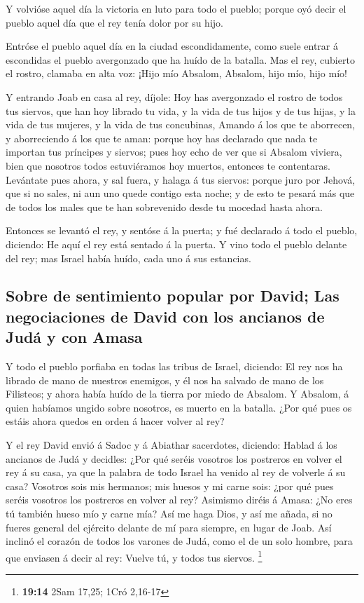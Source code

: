  Y volvióse aquel día la victoria en luto para todo el
pueblo; porque oyó decir el pueblo aquel día que el rey tenía dolor por
su hijo.

 Entróse el pueblo aquel día en la ciudad escondidamente,
como suele entrar á escondidas el pueblo avergonzado que ha huído de la
batalla.  Mas el rey, cubierto el rostro, clamaba en alta
voz: ¡Hijo mío Absalom, Absalom, hijo mío, hijo mío!

 Y entrando Joab en casa al rey, díjole: Hoy has avergonzado
el rostro de todos tus siervos, que han hoy librado tu vida, y la vida
de tus hijos y de tus hijas, y la vida de tus mujeres, y la vida de tus
concubinas,  Amando á los que te aborrecen, y aborreciendo á
los que te aman: porque hoy has declarado que nada te importan tus
príncipes y siervos; pues hoy echo de ver que si Absalom viviera, bien
que nosotros todos estuviéramos hoy muertos, entonces te contentaras.
 Levántate pues ahora, y sal fuera, y halaga á tus siervos:
porque juro por Jehová, que si no sales, ni aun uno quede contigo esta
noche; y de esto te pesará más que de todos los males que te han
sobrevenido desde tu mocedad hasta ahora.

 Entonces se levantó el rey, y sentóse á la puerta; y fué
declarado á todo el pueblo, diciendo: He aquí el rey está sentado á la
puerta. Y vino todo el pueblo delante del rey; mas Israel había huído,
cada uno á sus estancias.

\hypertarget{sobre-de-sentimiento-popular-por-david-las-negociaciones-de-david-con-los-ancianos-de-juduxe1-y-con-amasa}{%
\subsection{Sobre de sentimiento popular por David; Las negociaciones de
David con los ancianos de Judá y con
Amasa}\label{sobre-de-sentimiento-popular-por-david-las-negociaciones-de-david-con-los-ancianos-de-juduxe1-y-con-amasa}}

 Y todo el pueblo porfiaba en todas las tribus de Israel,
diciendo: El rey nos ha librado de mano de nuestros enemigos, y él nos
ha salvado de mano de los Filisteos; y ahora había huído de la tierra
por miedo de Absalom.  Y Absalom, á quien habíamos ungido
sobre nosotros, es muerto en la batalla. ¿Por qué pues os estáis ahora
quedos en orden á hacer volver al rey?

 Y el rey David envió á Sadoc y á Abiathar sacerdotes,
diciendo: Hablad á los ancianos de Judá y decidles: ¿Por qué seréis
vosotros los postreros en volver el rey á su casa, ya que la palabra de
todo Israel ha venido al rey de volverle á su casa? 
Vosotros sois mis hermanos; mis huesos y mi carne sois: ¿por qué pues
seréis vosotros los postreros en volver al rey?  Asimismo
diréis á Amasa: ¿No eres tú también hueso mío y carne mía? Así me haga
Dios, y así me añada, si no fueres general del ejército delante de mí
para siempre, en lugar de Joab.  Así inclinó el corazón de
todos los varones de Judá, como el de un solo hombre, para que enviasen
á decir al rey: Vuelve tú, y todos tus siervos. \footnote{\textbf{19:14}
  2Sam 17,25; 1Cró 2,16-17}

